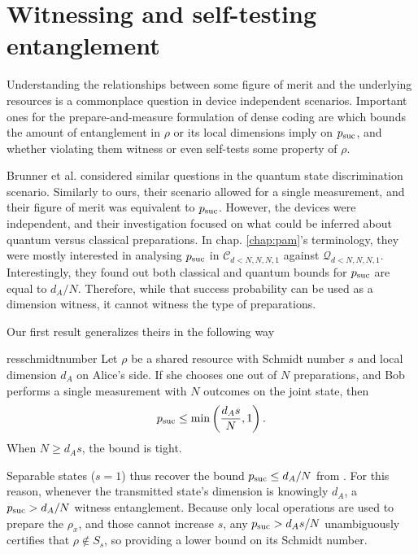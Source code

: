     \section{Witnessing and self-testing entanglement}

        Understanding the relationships between some figure of merit and the underlying resources is a commonplace question in device independent scenarios. Important ones for the prepare-and-measure formulation of dense coding are which bounds the amount of entanglement in $\rho$ or its local dimensions imply on $p_{\text{suc}}$, and whether violating them witness or even self-tests some property of $\rho$. 
    
        Brunner et al. \cite{brunner_dimension_2013} considered similar questions in the quantum state discrimination scenario. Similarly to ours, their scenario allowed for a single measurement, and their figure of merit was equivalent to $p_{\text{suc}}$. However, the devices were independent, and their investigation focused on what could be inferred about quantum versus classical preparations. In chap. \ref{chap:pam}'s terminology, they were mostly interested in analysing $p_{\text{suc}}$ in $\mathcal{C}_{d<N,N,N,1}$ against $\mathcal{Q}_{d<N,N,N,1}$. Interestingly, they found out both classical and quantum bounds for $p_{\text{suc}}$ are equal to $d_A / N$. Therefore, while that success probability can be used as a dimension witness, it cannot witness the type of preparations.
        
        Our first result generalizes theirs in the following way
        \begin{restatable}{res}{schmidtnumber}
            Let $\rho$ be a shared resource with Schmidt number $s$ and local dimension $d_A$ on Alice's side. If she chooses one out of $N$ preparations, and Bob performs a single measurement with $N$ outcomes on the joint state, then
            \begin{equation}
                p_{\text{suc}} \leq \min \left( \frac{d_A s}{N}, 1 \right) .
                \label{eq:result-1}
            \end{equation}
            When $N \geq d_A s$, the bound is tight.
            \label{res:1}
            \label{res:schmidt-number-witness}
        \end{restatable}
        Separable states ($s=1$) thus recover the bound $p_{\text{suc}} \leq d_A / N$ from \cite{brunner_dimension_2013}. For this reason, whenever the transmitted state's dimension is knowingly $d_A$, a $p_{\text{suc}} > d_A / N$ witness entanglement. Because only local operations are used to prepare the $\rho_x$, and those cannot increase $s$, any $p_{\text{suc}} > d_A s / N$ unambiguously certifies that $\rho \notin S_s$, so providing a lower bound on its Schmidt number.
        

